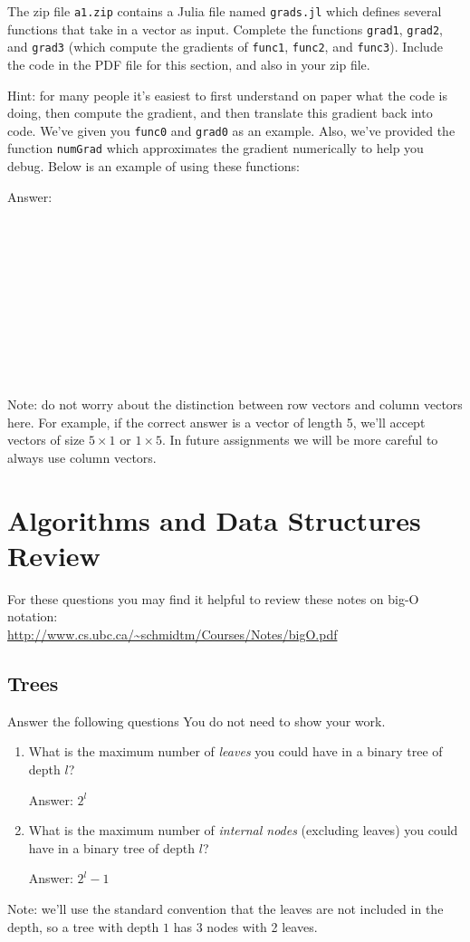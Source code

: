 \documentclass{article}
\def\ans#1{\par\gre{Answer: #1}}
\def\blu#1{{\color{blu}#1}}
\def\gre#1{{\color{gre}#1}}
\newcommand{\fig}[2]{\texttt{[image: a1f/\#2]}}
\begin{document}
The zip file \texttt{a1.zip} contains a Julia file named \texttt{grads.jl} which defines several functions that take in a vector as input. \blu{Complete the functions \texttt{grad1}, \texttt{grad2}, and \texttt{grad3} (which compute the gradients of \texttt{func1}, \texttt{func2}, and \texttt{func3})}. Include the code in the PDF file for this section, and also in your zip file.

Hint: for many people it's easiest to first understand on paper what the code is doing, then compute
the gradient, and then translate this gradient back into code. We've given you \texttt{func0} and \texttt{grad0} as an example. Also, we've provided the function \texttt{numGrad} which approximates the gradient numerically to help you debug. Below is an example of using these functions:\\

\ans{\\\\\\\\\\\\\\\\\\\\\\}

Note: do not worry about the distinction between row vectors and column vectors here.
For example, if the correct answer is a vector of length 5, we'll accept vectors of size $5 \times 1$ or $1 \times 5$. In future assignments we will be more careful to always use column vectors.
\pagebreak

\section{Algorithms and Data Structures Review}

For these questions you may find it helpful to review these notes on big-O notation:\\
\url{http://www.cs.ubc.ca/~schmidtm/Courses/Notes/bigO.pdf}

\subsection{Trees}

\blu{Answer the following questions} You do not need to show your work.
\begin{enumerate}
\item What is the maximum number of \emph{leaves} you could have in a binary tree of depth $l$?
\ans{$2^l$}
\item What is the maximum number of \emph{internal nodes} (excluding leaves) you could have in a binary tree of depth $l$?
\ans{$2^l - 1$}
\end{enumerate}
Note: we'll use the standard convention that the leaves are not included in the depth, so a tree with depth $1$ has 3 nodes with 2 leaves.
\end{document}
